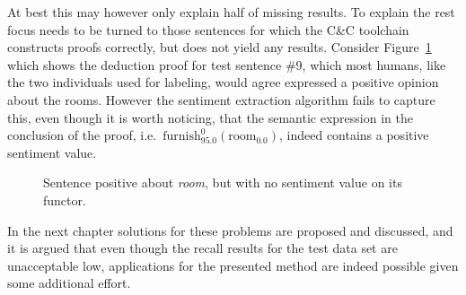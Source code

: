 At best this may however only explain half of missing results. To explain the rest focus needs to be turned to those sentences for which the C\&C toolchain constructs proofs correctly, but does not yield any results. Consider Figure~\ref{fig:verbSentiment} which shows the deduction proof for test sentence \#9, which most humans, like the two individuals used for labeling, would agree expressed a positive opinion about the rooms. However the sentiment extraction algorithm fails to capture this, even though it is worth noticing, that the semantic expression in the conclusion of the proof, i.e.\ $\mathrm{furnish}_{95.0}^{0}(\mathrm{room}_{0.0})$, indeed contains a positive sentiment value.

\begin{figure}[ht]
\begin{center}
\end{center}
\caption{Sentence positive about \emph{room}, but with no sentiment value on its functor.}
\label{fig:verbSentiment}
\end{figure}

In the next chapter solutions for these problems are proposed and discussed, and it is argued that even though the recall results for the test data set are unacceptable low, applications for the presented method are indeed possible given some additional effort.